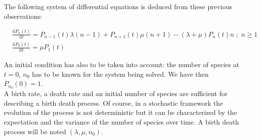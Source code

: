 \documentclass{article}
\begin{document}
The following system of differential equations is deduced from these previous observations:

\begin{align}

&\frac{\mathrm{d}P_n(t)}{\mathrm{d}t}=P_{n-1}(t)\lambda(n-1)+P_{n+1}(t)\mu(n+1)-(\lambda+\mu)P_n(t) n \; ; \; n\ge 1 \\

&\frac{\mathrm{d}P_0(t)}{\mathrm{d}t}= \mu P_1(t)

\end{align}

An initial condition has also to be taken into account: the number of species at $t=0$, $n_0$ has to be known for the system being solved. We have then $P_{n_0}(0)=1$.\\

A birth rate, a death rate and an initial number of species are sufficient for describing a birth death process. 
Of course, in a stochastic framework the evolution of the process is not deterministic but it can be characterized by the 
expectation and the variance of the number of species over time. A birth death process will be noted $(\lambda,\mu,n_0)$.
\end{document}
